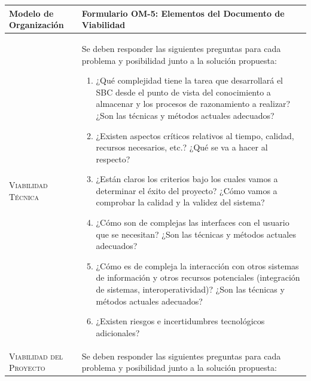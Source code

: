 \documentclass[12pt,a4paper,twoside,spanish]{article}      %
\begin{document}
        \begin{table}[H]
            \scriptsize
            \begin{tabularx}{\textwidth}{|l|X|} \hline
            
                \textbf{Modelo de Organización} & \textbf{Formulario OM-5: Elementos del Documento de Viabilidad}\\ \hline\hline
                
                \textsc{Viabilidad Técnica} & Se deben responder las siguientes preguntas para cada problema y posibilidad junto
                a la solución propuesta:
                
                \begin{enumerate}
                    \item ¿Qué complejidad tiene la tarea que desarrollará el SBC desde el punto de vista del conocimiento a almacenar y los procesos de razonamiento a realizar? ¿Son las técnicas y métodos actuales adecuados?
                    
                    \item ¿Existen aspectos críticos relativos al tiempo, calidad, recursos necesarios, etc.? ¿Qué se va a hacer al respecto?
                    
                    \item ¿Están claros los criterios bajo los cuales vamos a determinar el éxito del proyecto? ¿Cómo vamos a comprobar la calidad y la validez del sistema?
                    
                    \item ¿Cómo son de complejas las interfaces con el usuario que se necesitan? ¿Son las técnicas y métodos actuales adecuados?
                    
                    \item ¿Cómo es de compleja la interacción con otros sistemas de información y otros recursos potenciales (integración de sistemas, interoperatividad)? ¿Son las técnicas y métodos actuales adecuados?
                    
                    \item ¿Existen riesgos e incertidumbres tecnológicos adicionales?
                \end{enumerate}   \\ \hline
                
                
                \textsc{Viabilidad del Proyecto} & Se deben responder las siguientes preguntas para cada problema y posibilidad junto
                a la solución propuesta:
                

\end{tabularx}
\end{table}
\end{document}
